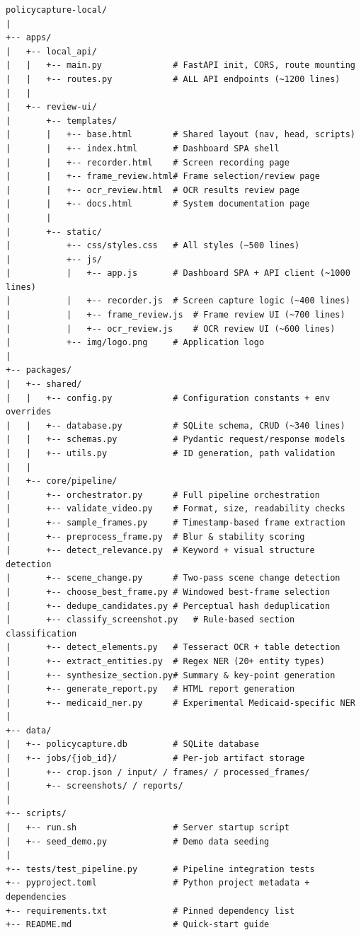 \documentclass[12pt, a4paper]{article}
\begin{document}
\begin{lstlisting}[style=plain]
policycapture-local/
|
+-- apps/
|   +-- local_api/
|   |   +-- main.py              # FastAPI init, CORS, route mounting
|   |   +-- routes.py            # ALL API endpoints (~1200 lines)
|   |
|   +-- review-ui/
|       +-- templates/
|       |   +-- base.html        # Shared layout (nav, head, scripts)
|       |   +-- index.html       # Dashboard SPA shell
|       |   +-- recorder.html    # Screen recording page
|       |   +-- frame_review.html# Frame selection/review page
|       |   +-- ocr_review.html  # OCR results review page
|       |   +-- docs.html        # System documentation page
|       |
|       +-- static/
|           +-- css/styles.css   # All styles (~500 lines)
|           +-- js/
|           |   +-- app.js       # Dashboard SPA + API client (~1000 lines)
|           |   +-- recorder.js  # Screen capture logic (~400 lines)
|           |   +-- frame_review.js  # Frame review UI (~700 lines)
|           |   +-- ocr_review.js    # OCR review UI (~600 lines)
|           +-- img/logo.png     # Application logo
|
+-- packages/
|   +-- shared/
|   |   +-- config.py            # Configuration constants + env overrides
|   |   +-- database.py          # SQLite schema, CRUD (~340 lines)
|   |   +-- schemas.py           # Pydantic request/response models
|   |   +-- utils.py             # ID generation, path validation
|   |
|   +-- core/pipeline/
|       +-- orchestrator.py      # Full pipeline orchestration
|       +-- validate_video.py    # Format, size, readability checks
|       +-- sample_frames.py     # Timestamp-based frame extraction
|       +-- preprocess_frame.py  # Blur & stability scoring
|       +-- detect_relevance.py  # Keyword + visual structure detection
|       +-- scene_change.py      # Two-pass scene change detection
|       +-- choose_best_frame.py # Windowed best-frame selection
|       +-- dedupe_candidates.py # Perceptual hash deduplication
|       +-- classify_screenshot.py   # Rule-based section classification
|       +-- detect_elements.py   # Tesseract OCR + table detection
|       +-- extract_entities.py  # Regex NER (20+ entity types)
|       +-- synthesize_section.py# Summary & key-point generation
|       +-- generate_report.py   # HTML report generation
|       +-- medicaid_ner.py      # Experimental Medicaid-specific NER
|
+-- data/
|   +-- policycapture.db         # SQLite database
|   +-- jobs/{job_id}/           # Per-job artifact storage
|       +-- crop.json / input/ / frames/ / processed_frames/
|       +-- screenshots/ / reports/
|
+-- scripts/
|   +-- run.sh                   # Server startup script
|   +-- seed_demo.py             # Demo data seeding
|
+-- tests/test_pipeline.py       # Pipeline integration tests
+-- pyproject.toml               # Python project metadata + dependencies
+-- requirements.txt             # Pinned dependency list
+-- README.md                    # Quick-start guide
\end{lstlisting}
\end{document}
